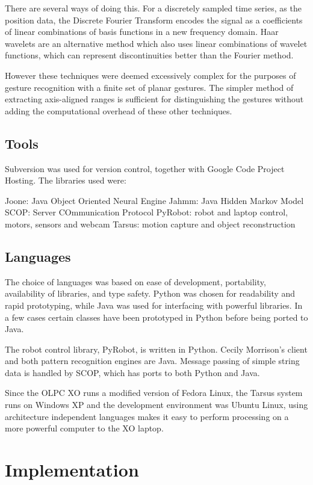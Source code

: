 \documentclass[12pt,a4,notitlepage]{report}
\renewcommand{\_}{\texttt{\symbol{95}}}
\newcommand{\<}{\texttt{\symbol{60}}}
\renewcommand{\>}{\texttt{\symbol{62}}}
\begin{document}
There are several ways of doing this. For a discretely sampled time series, as the position data, the Discrete Fourier Transform encodes the signal as a coefficients of linear combinations of basis functions in a new frequency domain. Haar wavelets are an alternative method which also uses linear combinations of wavelet functions, which can represent discontinuities better than the Fourier method.

However these techniques were deemed excessively complex for the purposes of gesture recognition with a finite set of planar gestures. The simpler method of extracting axis-aligned ranges is sufficient for distinguishing the gestures without adding the computational overhead of these other techniques.

\section{Tools}

Subversion was used for version control, together with Google Code Project Hosting. The libraries used were:

Joone: Java Object Oriented Neural Engine
Jahmm: Java Hidden Markov Model
SCOP: Server COmmunication Protocol
PyRobot: robot and laptop control, motors, sensors and webcam
Tarsus: motion capture and object reconstruction

\section{Languages}

The choice of languages was based on ease of development, portability, availability of libraries, and type safety. Python was chosen for readability and rapid prototyping, while Java was used for interfacing with powerful libraries. In a few cases certain classes have been prototyped in Python before being ported to Java.

The robot control library, PyRobot, is written in Python. Cecily Morrison's client and both pattern recognition engines are Java. Message passing of simple string data is handled by SCOP, which has ports to both Python and Java.

Since the OLPC XO runs a modified version of Fedora Linux, the Tarsus system runs on Windows XP and the development environment was Ubuntu Linux, using architecture independent languages makes it easy to perform processing on a more powerful computer to the XO laptop.

\chapter{Implementation}
\end{document}
